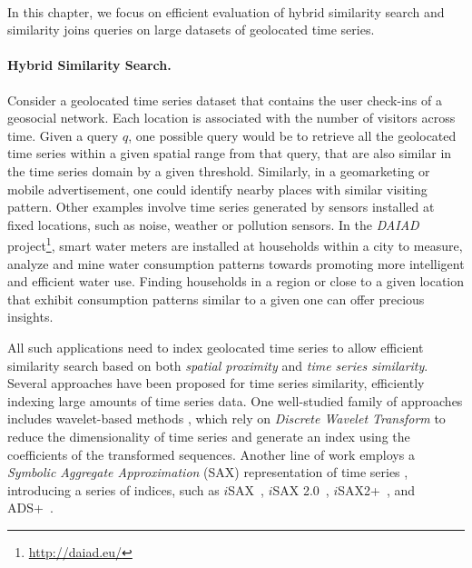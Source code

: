 
\graphicspath{{Papers/SIGSpatial2017/}{Papers/SIGSpatial2018/}}

In this chapter, we focus on efficient evaluation of hybrid similarity search and similarity joins queries on large datasets of geolocated time series. 

\paragraph{Hybrid Similarity Search.} Consider a geolocated time series dataset that contains the user check-ins of a geosocial network. Each location is associated with the number of visitors across time. Given a query $q$, one possible query would be to retrieve all the geolocated time series within a given spatial range from that query, that are also similar in the time series domain by a given threshold. Similarly, in a geomarketing or mobile advertisement, one could identify nearby places with similar visiting pattern. Other examples involve time series generated by sensors installed at fixed locations, such as noise, weather or pollution sensors. In the \textit{DAIAD} project\footnote{\url{http://daiad.eu/}}, smart water meters are installed at households within a city to measure, analyze and mine water consumption patterns towards promoting more intelligent and efficient water use. Finding households in a region or close to a given location that exhibit consumption patterns similar to a given one can offer precious insights.

All such applications need to index geolocated time series to allow efficient similarity search based on both {\em spatial proximity} and {\em time series similarity}. Several approaches have been proposed for time series similarity, efficiently indexing large amounts of time series data. One well-studied family of approaches includes wavelet-based methods \cite{chan1999icde}, which rely on \emph{Discrete Wavelet Transform} \cite{graps1995cse} to reduce the dimensionality of time series and generate an index using the coefficients of the transformed sequences. Another line of work employs a \emph{Symbolic Aggregate Approximation} (SAX) representation of time series \cite{jessica2007dmkd}, introducing a series of indices, such as $i$SAX~\cite{shieh2008kdd}, $i$SAX 2.0~\cite{camerra2010icdm}, $i$SAX2+~\cite{camerra2014kais}, and ADS+~\cite{zoumpatianos2014sigmod}.


